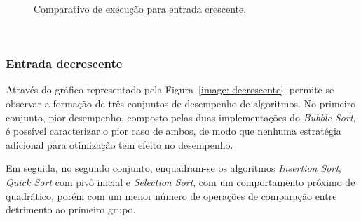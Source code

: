 \documentclass[conference]{IEEEtran}
\begin{document}
\begin{figure}


\centering
{}
\caption{Comparativo de execução para entrada crescente.}
\label{image: crescente}
\end{figure}

~\\
\subsubsection{Entrada decrescente}

Através do gráfico representado pela Figura~\ref{image: decrescente}, permite-se observar a formação de três conjuntos de desempenho de algoritmos. No primeiro conjunto, pior desempenho, composto pelas duas implementações do \textit{Bubble Sort}, é possível caracterizar o pior caso de ambos, de modo que nenhuma estratégia adicional para otimização tem efeito no desempenho. 

Em seguida, no segundo conjunto, enquadram-se os algoritmos \textit{Insertion Sort}, \textit{Quick Sort} com pivô inicial e \textit{Selection Sort}, com um comportamento próximo de quadrático, porém com um menor número de operações de comparação entre detrimento ao primeiro grupo.
\end{document}
